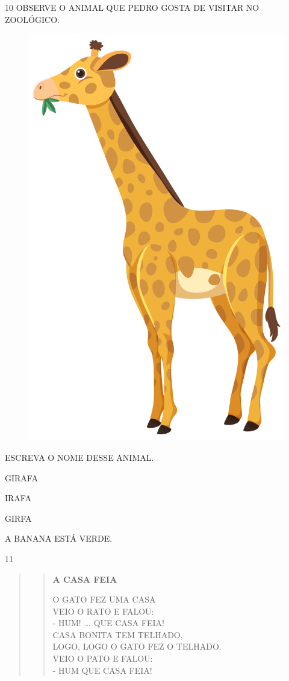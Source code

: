 \pagebreak
\num{10} OBSERVE O ANIMAL QUE PEDRO GOSTA DE VISITAR NO ZOOLÓGICO.

\begin{figure}[htpb]
\centering
\includegraphics[width=.3\textwidth]{media/image219.jpg}
\end{figure}

ESCREVA O NOME DESSE ANIMAL.

\begin{escolha}
\item GIRAFA

\item IRAFA

\item GIRFA

\item A BANANA ESTÁ VERDE.
\end{escolha}

\num{11}

\begin{quote}
\begin{verse}
\textbf{A CASA FEIA}

O GATO FEZ UMA CASA\\
VEIO O RATO E FALOU:\\
- HUM! ... QUE CASA FEIA!\\
CASA BONITA TEM TELHADO,\\
LOGO, LOGO O GATO FEZ O TELHADO.\\
VEIO O PATO E FALOU:\\
- HUM QUE CASA FEIA!
\end{verse}
\end{quote}

